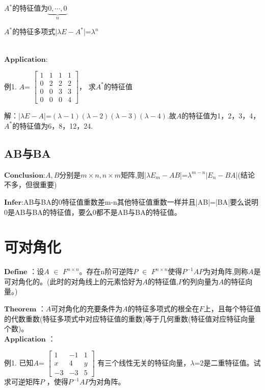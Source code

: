 \documentclass[a4paper,12pt]{book}
\begin{document}
$\mathit{A}$$^{*}$的特征值为$\underset{n}{\underbrace{0,\cdots ,0} } $

$\mathit{A}^{*}$的特征多项式|$\lambda\mathit{E-{A}^{*}}$|=$\lambda^{n}$

~\\

$\mathbf{Application}$:

例1.  $\mathit{A}$=
$\begin{bmatrix}
	1 & 1 & 1 & 1\\
	0  & 2 & 2 & 2\\
	0 & 0 & 3 & 3\\
	0 & 0 & 0 &4
\end{bmatrix}$，
求$\mathit{A}^{*}$的特征值

解：|$\lambda E-\mathit{A}$|=$(\lambda-1)(\lambda-2)(\lambda-3)(\lambda-4)$.故$\mathit{A}$的特征值为1，2，3，4，$\mathit{A}^{*}$的特征值为6，8，12，24.~\\

\subsection{AB与BA}

$\mathbf{Conclusion}$:$\mathit{A,B}$分别是$m\times n,n\times m$矩阵,则|$\lambda \mathit{E_{m}-AB}$|=$\lambda^{m-n}|\mathit{E_{n}-BA}$|(结论不多，但很重要)

$\mathbf{Infer}$:AB与BA的0特征值重数差m-n其他特征值重数一样并且|AB|=|BA|要么说明0是AB与BA的特征值，要么0都不是AB与BA的特征值。

\section{可对角化}

$\mathbf{Define}$ ：设$\mathit{A}$ $\in$ $\mathit{F^{n\times n} }$。存在n阶可逆阵$\mathit{P}$ $\in$ $\mathit{F^{n\times n} }$使得$\mathit{P^{-1}AP}$为对角阵,则称$\mathit{A}$是可对角化的。(此时的对角线上的元素恰好为$\mathit{A}$的特征值,$\mathit{P}$的列向量为$\mathit{A}$的特征向量。)

$\mathbf{Theorem}$ ：$\mathit{A}$可对角化的充要条件为$\mathit{A}$的特征多项式的根全在$\mathit{F}$上，且每个特征值的代数重数(特征多项式中对应特征值的重数)等于几何重数(特征值对应特征向量个数)。~\\

$\mathbf{Application}$ ：

例1. 已知$\mathit{A}$=
$\begin{bmatrix}
	1& -1 & 1\\
	x& 4 & y\\
	-3 &-3  &5
\end{bmatrix}$
有三个线性无关的特征向量，$\lambda$=2是二重特征值。试求可逆矩阵$\mathit{P}$ ，使得$\mathit{P^{-1}AP}$为对角阵。
\end{document}
